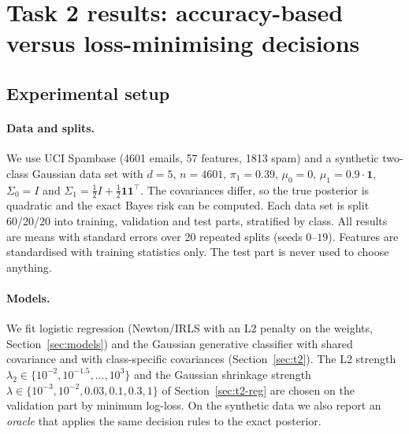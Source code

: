 \providecommand{\todo}[1]{\textbf{[TODO: #1]}}
\providecommand{\cFP}{c_{\mathrm{FP}}}
\providecommand{\cFN}{c_{\mathrm{FN}}}
\providecommand{\cI}{c_{\mathrm{I}}}

\section{Task 2 results: accuracy-based versus loss-minimising decisions}
\label{sec:task2-results}

\subsection{Experimental setup}
\paragraph{Data and splits.}
We use UCI Spambase (4601 emails, 57 features, 1813 spam) and a synthetic two-class Gaussian data set with
$d=5$, $n=4601$, $\pi_1=0.39$, $\mu_0=0$, $\mu_1=0.9\cdot\mathbf 1$, $\Sigma_0=I$ and
$\Sigma_1=\tfrac12 I+\tfrac12\mathbf 1\mathbf 1^{\top}$. The covariances differ, so the true posterior is quadratic
and the exact Bayes risk can be computed. Each data set is split 60/20/20 into training, validation and test parts,
stratified by class. All results are means with standard errors over 20 repeated splits (seeds $0$--$19$).
Features are standardised with training statistics only. The test part is never used to choose anything.

\paragraph{Models.}
We fit logistic regression (Newton/IRLS with an L2 penalty on the weights, Section~\ref{sec:models}) and the
Gaussian generative classifier with shared covariance and with class-specific covariances
(Section~\ref{sec:t2}). The L2 strength $\lambda_2\in\{10^{-2},10^{-1.5},\dots,10^{3}\}$ and the Gaussian
shrinkage strength $\lambda\in\{10^{-3},10^{-2},0.03,0.1,0.3,1\}$ of Section~\ref{sec:t2-reg} are chosen on the validation
part by minimum log-loss. On the synthetic data we also report an \emph{oracle} that applies the same decision
rules to the exact posterior.

